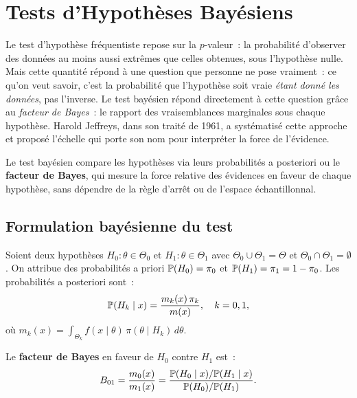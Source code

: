 \chapter{Tests d'Hypoth\`eses Bay\'esiens}
\label{ch:tests}

Le test d'hypoth\`ese fr\'equentiste repose sur la $p$-valeur~: la probabilit\'e d'observer des donn\'ees au moins aussi extr\^emes que celles obtenues, sous l'hypoth\`ese nulle. Mais cette quantit\'e r\'epond \`a une question que personne ne pose vraiment~: ce qu'on veut savoir, c'est la probabilit\'e que l'hypoth\`ese soit vraie \emph{\'etant donn\'e les donn\'ees}, pas l'inverse. Le test bay\'esien r\'epond directement \`a cette question gr\^ace au \emph{facteur de Bayes}~: le rapport des vraisemblances marginales sous chaque hypoth\`ese. Harold Jeffreys, dans son trait\'e de 1961, a syst\'ematis\'e cette approche et propos\'e l'\'echelle qui porte son nom pour interpr\'eter la force de l'\'evidence.

\begin{intuition}[title=\textbf{Id\'ee centrale}]
Le test bay\'esien compare les hypoth\`eses via leurs probabilit\'es a
posteriori ou le \textbf{facteur de Bayes}, qui mesure la force relative
des \'evidences en faveur de chaque hypoth\`ese, sans d\'ependre de la
r\`egle d'arr\^et ou de l'espace \'echantillonnal.
\end{intuition}

\section{Formulation bay\'esienne du test}

\begin{definition}
Soient deux hypoth\`eses $H_0 : \theta \in \Theta_0$ et
$H_1 : \theta \in \Theta_1$ avec $\Theta_0 \cup \Theta_1 = \Theta$
et $\Theta_0 \cap \Theta_1 = \emptyset$. On attribue des probabilit\'es
a priori $\mathbb{P}(H_0) = \pi_0$ et $\mathbb{P}(H_1) = \pi_1 = 1 - \pi_0$.
Les probabilit\'es a posteriori sont~:
\[
  \mathbb{P}(H_k \mid x) = \frac{m_k(x)\,\pi_k}{m(x)},
  \quad k = 0, 1,
\]
o\`u $m_k(x) = \int_{\Theta_k} f(x \mid \theta)\,\pi(\theta \mid H_k)\,d\theta$.
\end{definition}

\begin{definition}
Le \textbf{facteur de Bayes} en faveur de $H_0$ contre $H_1$ est~:
\[
  B_{01} = \frac{m_0(x)}{m_1(x)}
  = \frac{\mathbb{P}(H_0 \mid x) / \mathbb{P}(H_1 \mid x)}
         {\mathbb{P}(H_0) / \mathbb{P}(H_1)}.
\]
\end{definition}

